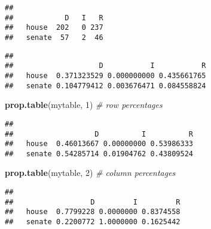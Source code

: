 \documentclass[
]{book}
\newenvironment{Shaded}{\begin{snugshade}}{\end{snugshade}}
\newcommand{\CommentTok}[1]{\textcolor[rgb]{0.56,0.35,0.01}{\textit{#1}}}
\newcommand{\DecValTok}[1]{\textcolor[rgb]{0.00,0.00,0.81}{#1}}
\newcommand{\KeywordTok}[1]{\textcolor[rgb]{0.13,0.29,0.53}{\textbf{#1}}}
\newcommand{\NormalTok}[1]{#1}
\newcommand{\OperatorTok}[1]{\textcolor[rgb]{0.81,0.36,0.00}{\textbf{#1}}}
\newcommand{\StringTok}[1]{\textcolor[rgb]{0.31,0.60,0.02}{#1}}
\begin{document}
\begin{verbatim}
##         
##            D   I   R
##   house  202   0 237
##   senate  57   2  46
\end{verbatim}

\begin{Shaded}
\end{Shaded}

\begin{verbatim}
##         
##                    D           I           R
##   house  0.371323529 0.000000000 0.435661765
##   senate 0.104779412 0.003676471 0.084558824
\end{verbatim}

\begin{Shaded}
\begin{Highlighting}[]
\KeywordTok{prop.table}\NormalTok{(mytable, }\DecValTok{1}\NormalTok{) }\CommentTok{# row percentages}
\end{Highlighting}
\end{Shaded}

\begin{verbatim}
##         
##                   D          I          R
##   house  0.46013667 0.00000000 0.53986333
##   senate 0.54285714 0.01904762 0.43809524
\end{verbatim}

\begin{Shaded}
\begin{Highlighting}[]
\KeywordTok{prop.table}\NormalTok{(mytable, }\DecValTok{2}\NormalTok{) }\CommentTok{# column percentages}
\end{Highlighting}
\end{Shaded}

\begin{verbatim}
##         
##                  D         I         R
##   house  0.7799228 0.0000000 0.8374558
##   senate 0.2200772 1.0000000 0.1625442
\end{verbatim}

\begin{Shaded}
\end{Shaded}
\end{document}
